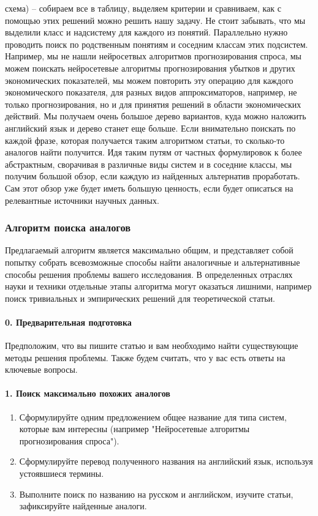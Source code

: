 \documentclass{report}
\begin{document}
схема) – собираем все в таблицу, выделяем критерии и сравниваем, как с помощью этих решений можно решить нашу задачу. Не стоит забывать, что мы выделили класс и надсистему для каждого из понятий. Параллельно нужно проводить поиск по родственным понятиям и соседним классам этих подсистем. Например, мы не нашли нейросетвых алгоритмов прогнозирования спроса, мы можем поискать нейросетевые алгоритмы прогнозирования убытков и других экономических показателей, мы можем повторить эту операцию для каждого экономического показателя, для разных видов аппроксиматоров, например, не только прогнозирования, но и для принятия решений в области экономических действий. Мы получаем очень большое дерево вариантов, куда можно наложить английский язык и дерево станет еще больше. Если внимательно поискать по каждой фразе, которая получается таким алгоритмом статьи, то сколько-то аналогов найти получится. Идя таким путям от частных формулировок к более абстрактным, сворачивая в различные виды систем и в соседние классы, мы получим большой обзор, если каждую из найденных альтернатив проработать. Сам этот обзор уже будет иметь большую ценность, если будет описаться на релевантные источники научных данных.

\subsubsection{Алгоритм поиска аналогов}
Предлагаемый алгоритм является максимально общим, и представляет собой попытку собрать всевозможные способы найти аналогичные и альтернативные способы решения проблемы вашего исследования. В определенных отраслях науки и техники отдельные этапы алгоритма могут оказаться лишними, например поиск тривиальных и эмпирических решений для теоретической статьи.
\paragraph{0. Предварительная подготовка}
Предположим, что вы пишите статью и вам необходимо найти существующие методы решения проблемы. Также будем считать, что у вас есть ответы на ключевые вопросы.
\paragraph{1. Поиск максимально похожих аналогов}
\begin{enumerate}
	\item Сформулируйте одним предложением общее название для типа систем, которые вам интересны (например "Нейросетевые алгоритмы прогнозирования спроса").
	\item Сформулируйте перевод полученного названия на английский язык, используя устоявшиеся термины.
	\item Выполните поиск по названию на русском и английском, изучите статьи, зафиксируйте найденные аналоги.
\end{enumerate}
\end{document}
